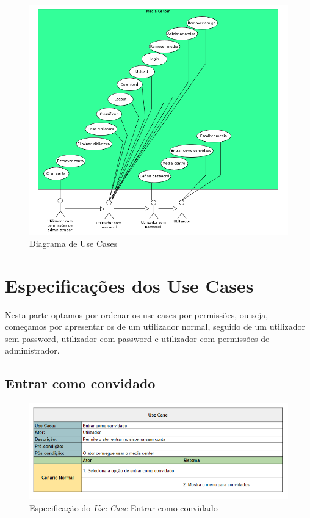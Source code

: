 \documentclass[a4paper]{report}
\begin{document}
\begin{figure}[H]
	\centering 
    \includegraphics[width=\textwidth]{images/UseCases.png}  
    \caption{Diagrama de Use Cases}
\end{figure}



\section{Especificações dos Use Cases}

Nesta parte optamos por ordenar os use cases por permissões, ou seja, começamos
por apresentar os de um utilizador normal, seguido de um utilizador sem
password, utilizador com password e utilizador com permissões de administrador.

\subsection{Entrar como convidado}

\begin{figure}[H]
	\centering 
    \includegraphics[width=\textwidth]{images/Entrar_como_convidado.png}  
    \caption{Especificação do \emph{Use Case} Entrar como convidado}
\end{figure}
\end{document}
